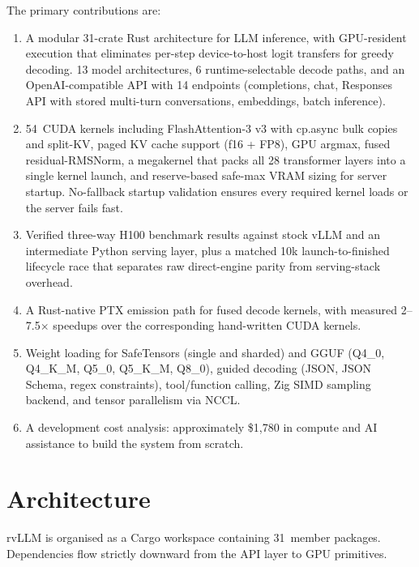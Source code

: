 The primary contributions are:
\begin{enumerate}
  \item A modular 31-crate Rust architecture for LLM inference, with GPU-resident
        execution that eliminates per-step device-to-host logit transfers for greedy
        decoding. 13 model architectures, 6 runtime-selectable decode paths, and an
        OpenAI-compatible API with 14 endpoints (completions, chat, Responses API with
        stored multi-turn conversations, embeddings, batch inference).
  \item 54~CUDA kernels including FlashAttention-3 v3 with cp.async bulk copies and split-KV,
        paged KV cache support (f16 + FP8), GPU argmax, fused residual-RMSNorm, a
        megakernel that packs all 28 transformer layers into a single kernel launch,
        and reserve-based safe-max VRAM sizing for server startup. No-fallback startup
        validation ensures every required kernel loads or the server fails fast.
  \item Verified three-way H100 benchmark results against stock vLLM and an
        intermediate Python serving layer, plus a matched 10k launch-to-finished
        lifecycle race that separates raw direct-engine parity from serving-stack
        overhead.
  \item A Rust-native PTX emission path for fused decode kernels, with measured
        2--7.5$\times$ speedups over the corresponding hand-written CUDA kernels.
  \item Weight loading for SafeTensors (single and sharded) and GGUF (Q4\_0, Q4\_K\_M,
        Q5\_0, Q5\_K\_M, Q8\_0), guided decoding (JSON, JSON Schema, regex constraints),
        tool/function calling, Zig SIMD sampling backend, and tensor parallelism via NCCL.
  \item A development cost analysis: approximately \$1{,}780 in compute and AI
        assistance to build the system from scratch.
\end{enumerate}

\section{Architecture}
\label{sec:architecture}

rvLLM is organised as a Cargo workspace containing 31~member packages. Dependencies
flow strictly downward from the API layer to GPU primitives.

